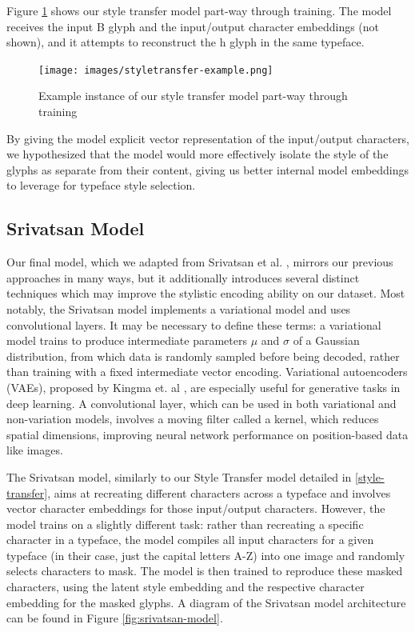 Figure \ref{fig:styletransfer-example} shows our style transfer model part-way through training. The model receives the input { B} glyph and the input/output character embeddings (not shown), and it attempts to reconstruct the { h} glyph in the same typeface.

\begin{figure}[h]
    \centering
    \texttt{[image: images/styletransfer-example.png]}
    \caption{Example instance of our style transfer model part-way through training}
    \label{fig:styletransfer-example}
\end{figure}

By giving the model explicit vector representation of the input/output characters, we hypothesized that the model would more effectively isolate the style of the glyphs as separate from their content, giving us better internal model embeddings to leverage for typeface style selection.

\subsection{Srivatsan Model}

Our final model, which we adapted from Srivatsan et al. \cite{srivatsan2020}, mirrors our previous approaches in many ways, but it additionally introduces several distinct techniques which may improve the stylistic encoding ability on our dataset. Most notably, the Srivatsan model implements a variational model and uses convolutional layers. It may be necessary to define these terms: a variational model trains to produce intermediate parameters $\mu$ and $\sigma$ of a Gaussian distribution, from which data is randomly sampled before being decoded, rather than training with a fixed intermediate vector encoding. Variational autoencoders (VAEs), proposed by Kingma et. al \cite{kingma2019}, are especially useful for generative tasks in deep learning. A convolutional layer, which can be used in both variational and non-variation models, involves a moving filter called a kernel, which reduces spatial dimensions, improving neural network performance on position-based data like images.

The Srivatsan model, similarly to our Style Transfer model detailed in \ref{style-transfer}, aims at recreating different characters across a typeface and involves vector character embeddings for those input/output characters. However, the model trains on a slightly different task: rather than recreating a specific character in a typeface, the model compiles all input characters for a given typeface (in their case, just the capital letters A-Z) into one image and randomly selects characters to mask. The model is then trained to reproduce these masked characters, using the latent style embedding and the respective character embedding for the masked glyphs. A diagram of the Srivatsan model architecture can be found in Figure \ref{fig:srivatsan-model}.

